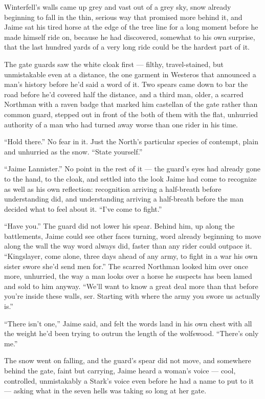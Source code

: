 \sceneBreak

Winterfell’s walls came up grey and vast out of a grey sky, snow already beginning to fall in the thin, serious way that promised more behind it, and Jaime sat his tired horse at the edge of the tree line for a long moment before he made himself ride on, because he had discovered, somewhat to his own surprise, that the last hundred yards of a very long ride could be the hardest part of it.

The gate guards saw the white cloak first — filthy, travel-stained, but unmistakable even at a distance, the one garment in Westeros that announced a man’s history before he’d said a word of it. Two spears came down to bar the road before he’d covered half the distance, and a third man, older, a scarred Northman with a raven badge that marked him castellan of the gate rather than common guard, stepped out in front of the both of them with the flat, unhurried authority of a man who had turned away worse than one rider in his time.

“Hold there.” No fear in it. Just the North’s particular species of contempt, plain and unhurried as the snow. “State yourself.”

“Jaime Lannister.” No point in the rest of it — the guard’s eyes had already gone to the hand, to the cloak, and settled into the look Jaime had come to recognize as well as his own reflection: recognition arriving a half-breath before understanding did, and understanding arriving a half-breath before the man decided what to feel about it. “I’ve come to fight.”

“Have you.” The guard did not lower his spear. Behind him, up along the battlements, Jaime could see other faces turning, word already beginning to move along the wall the way word always did, faster than any rider could outpace it. “Kingslayer, come alone, three days ahead of any army, to fight in a war his own sister swore she’d send men for.” The scarred Northman looked him over once more, unhurried, the way a man looks over a horse he suspects has been lamed and sold to him anyway. “We’ll want to know a great deal more than that before you’re inside these walls, ser. Starting with where the army you swore us actually is.”

“There isn’t one,” Jaime said, and felt the words land in his own chest with all the weight he’d been trying to outrun the length of the wolfswood. “There’s only me.”

The snow went on falling, and the guard’s spear did not move, and somewhere behind the gate, faint but carrying, Jaime heard a woman’s voice — cool, controlled, unmistakably a Stark’s voice even before he had a name to put to it — asking what in the seven hells was taking so long at her gate.